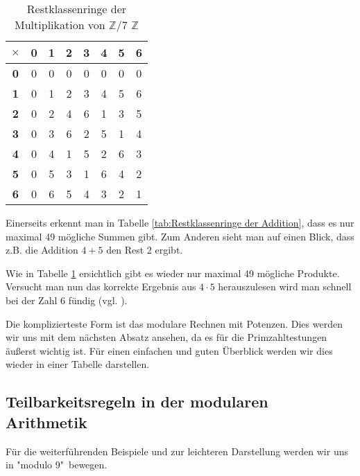 \documentclass[12pt,a4paper]{article}
\theoremstyle{definition}
\begin{document}
\begin{table}[h]\begin{center}
\begin{tabular}{c||c|c|c|c|c|c|c}
\textbf{$\times$} & \textbf{0} & \textbf{1} & \textbf{2} & \textbf{3} & \textbf{4} & \textbf{5} & \textbf{6} \\
\hline\hline
\textbf{0} & 0 & 0 & 0 & 0 & 0 & 0 & 0 \\
\hline
\textbf{1} & 0 & 1 & 2 & 3 & 4 & 5 & 6 \\
\hline
\textbf{2} & 0 & 2 & 4 & 6 & 1 & 3 & 5 \\
\hline
\textbf{3} & 0 & 3 & 6 & 2 & 5 & 1 & 4 \\
\hline
\textbf{4} & 0 & 4 & 1 & 5 & 2 & 6 & 3 \\
\hline
\textbf{5} & 0 & 5 & 3 & 1 & 6 & 4 & 2 \\
\hline
\textbf{6} & 0 & 6 & 5 & 4 & 3 & 2 & 1
\end{tabular}\end{center}
\caption{Restklassenringe der Multiplikation von $\mathbb{Z}$/7 $\mathbb{Z}$}
\label{tab:Restklassenringe der Multiplikation}
\end{table}

Einerseits erkennt man in Tabelle \ref{tab:Restklassenringe der Addition}, dass es nur maximal 49 mögliche Summen gibt.
Zum Anderen sieht man auf einen Blick, dass z.B. die Addition $4 + 5$ den Rest 2 ergibt.

Wie in Tabelle \ref{tab:Restklassenringe der Multiplikation} ersichtlich gibt es wieder nur maximal 49 mögliche Produkte.
Versucht man nun das korrekte Ergebnis aus $4 \cdot 5$ herauszulesen wird man schnell bei der Zahl 6 fündig (vgl. \cite[68]{RempeGillen2009}).

Die komplizierteste Form ist das modulare Rechnen mit Potenzen.
Dies werden wir uns mit dem nächsten Absatz ansehen, da es für die Primzahltestungen äußerst wichtig ist.
Für einen einfachen und guten Überblick werden wir dies wieder in einer Tabelle darstellen.

\newpage
\subsection{Teilbarkeitsregeln in der modularen Arithmetik}
Für die weiterführenden Beispiele und zur leichteren Darstellung werden wir uns in "modulo 9"\ bewegen.
\end{document}
